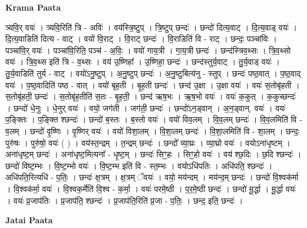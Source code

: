 \documentclass[17pt]{extarticle}
\begin{document}
\textbf{Krama Paata} \newline

त्र्यवि॒र् वयः॑ । त्र्यवि॒रिति॑ त्रि - अविः॑ । वय॑स्त्रि॒ष्टुप् । त्रि॒ष्टुप् छन्दः॑ । छन्दो॑ दित्य॒वाट् । दि॒त्य॒वाड् वयः॑ । दि॒त्य॒वाडिति॑ दित्य - वाट् । वयो॑ वि॒राट् । वि॒राट् छन्दः॑ । वि॒राडिति॑ वि - राट् । छन्दः॒ पञ्चा॑विः । पञ्चा॑वि॒र् वयः॑ । पञ्चा॑वि॒रिति॒ पञ्च॑ - अ॒विः॒ । वयो॑ गाय॒त्री । गा॒य॒त्री छन्दः॑ । छन्द॑स्त्रिव॒थ्सः । त्रि॒व॒थ्सो वयः॑ । त्रि॒व॒थ्स इति॑ त्रि - व॒थ्सः । वय॑ उ॒ष्णिहा᳚ । उ॒ष्णिहा॒ छन्दः॑ । छन्द॑स्तुर्य॒वाट् । तु॒र्य॒वाड् वयः॑ । तु॒र्य॒वाडिति॑ तुर्य - वाट् । वयो॑ऽनु॒ष्टुप् । अ॒नु॒ष्टुप् छन्दः॑ । अ॒नु॒ष्टुबित्य॑नु - स्तुप् । छन्दः॑ पष्ठ॒वात् । प॒ष्ठ॒वाद् वयः॑ । प॒ष्ठ॒वादिति॑ पष्ठ - वात् । वयो॑ बृह॒ती । बृ॒ह॒ती छन्दः॑ । छन्द॑ उ॒क्षा । उ॒क्षा वयः॑ । वयः॑ स॒तोबृ॑हती । स॒तोबृ॑हती॒ छन्दः॑ । स॒तोबृ॑ह॒तीति॑ स॒तः - बृ॒ह॒ती॒ । छन्द॑ ऋष॒भः । ऋ॒ष॒भो वयः॑ । वयः॑ क॒कुत् । क॒कुच्छन्दः॑ । छन्दो॑ धे॒नुः । धे॒नुर् वयः॑ । वयो॒ जग॑ती । जग॑ती॒ छन्दः॑ । छन्दो॑ऽन॒ड्वान् । अ॒न॒ड्वान्. वयः॑ । वयः॑ प॒ङ्क्तिः । प॒ङ्क्ति श्छन्दः॑ । छन्दो॑ ब॒स्तः । ब॒स्तो वयः॑ । वयो॑ विव॒लम् । वि॒व॒लम् छन्दः॑ । वि॒व॒लमिति॑ वि - व॒लम् । छन्दो॑ वृ॒ष्णिः । वृ॒ष्णिर् वयः॑ । वयो॑ विशा॒लम् । वि॒शा॒लम् छन्दः॑ । वि॒शा॒लमिति॑ वि - शा॒लम् । छन्दः॒ पुरु॑षः । पुरु॑षो॒ वयः॑ ( ) । वय॑स्त॒न्द्रम् । त॒न्द्रम् छन्दः॑ । छन्दो᳚ व्या॒घ्रः । व्या॒घ्रो वयः॑ । वयोऽना॑धृष्टम् । अना॑धृष्ट॒म् छन्दः॑ । अना॑धृष्ट॒मित्यना᳚ - धृ॒ष्ट॒म् । छन्दः॑ सिꣳ॒॒हः । सिꣳ॒॒हो वयः॑ । वय॑ श्छ॒दिः । छ॒दि श्छन्दः॑ । छन्दो॑ विष्ट॒म्भः । वि॒ष्ट॒म्भो वयः॑ । वि॒ष्ट॒म्भ इति॑ वि - स्त॒म्भः । वयोऽधि॑पतिः । अधि॑पति॒ श्छन्दः॑ । अधि॑पति॒रित्यधि॑ - प॒तिः॒ । छन्दः॑ क्ष॒त्रम् । क्ष॒त्रम् ॅवयः॑ । वयो॒ मय॑न्दम् । मय॑न्द॒म् छन्दः॑ । छन्दो॑ वि॒श्वक॑र्मा । वि॒श्वक॑र्मा॒ वयः॑ । वि॒श्वक॒र्मेति॑ वि॒श्व - क॒र्मा॒ । वयः॑ परमे॒ष्ठी । प॒र॒मे॒ष्ठी छन्दः॑ । छन्दो॑ मू॒र्द्धा । मू॒र्द्धा वयः॑ । वयः॑ प्र॒जाप॑तिः । प्र॒जाप॑ति॒ श्छन्दः॑ । प्र॒जाप॑ति॒रिति॑ प्र॒जा - प॒तिः॒ । छन्द॒ इति॒ छन्दः॑ । \newline

\textbf{Jatai Paata} \newline
\end{document}
